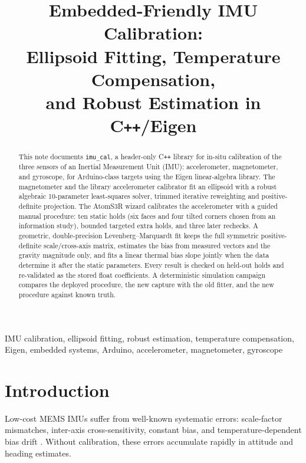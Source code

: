 \documentclass[conference]{IEEEtran}
\title{Embedded-Friendly IMU Calibration:\\
Ellipsoid Fitting, Temperature Compensation,\\
and Robust Estimation in C\texttt{++}/Eigen}
\author{%
    \IEEEauthorblockN{Mikhail S.\ Grushinskiy}
    \IEEEauthorblockA{Independent Researcher\\
    Bareboat Necessities Project\\
    \texttt{mgrouch@users.github.com}}
}
\begin{document}
    \maketitle

    \begin{abstract}
        This note documents \texttt{imu\_cal}, a header-only C\texttt{++}
        library for in-situ calibration of the three sensors of an Inertial
        Measurement Unit (IMU): accelerometer, magnetometer, and gyroscope,
        for Arduino-class targets using the Eigen linear-algebra library.
        The magnetometer and the library accelerometer calibrator fit an
        ellipsoid with a robust algebraic 10-parameter least-squares solver,
        trimmed iterative reweighting and positive-definite projection.
        The AtomS3R wizard calibrates the accelerometer with a guided manual
        procedure: ten static holds (six faces and four tilted corners chosen
        from an information study), bounded targeted extra holds, and three
        later rechecks. A geometric, double-precision Levenberg--Marquardt fit
        keeps the full symmetric positive-definite scale/cross-axis matrix,
        estimates the bias from measured vectors and the gravity magnitude
        only, and fits a linear thermal bias slope jointly when the data
        determine it after the static parameters. Every result is checked on
        held-out holds and re-validated as the stored float coefficients.
        A deterministic simulation campaign compares the deployed procedure,
        the new capture with the old fitter, and the new procedure against
        known truth.
    \end{abstract}

    \begin{IEEEkeywords}
        IMU calibration, ellipsoid fitting, robust estimation,
        temperature compensation, Eigen, embedded systems, Arduino,
        accelerometer, magnetometer, gyroscope
    \end{IEEEkeywords}

    \section{Introduction}

    Low-cost MEMS IMUs suffer from well-known systematic errors:
    scale-factor mismatches, inter-axis cross-sensitivity, constant bias,
    and temperature-dependent bias drift \cite{Frosio2009}.
    Without calibration, these errors accumulate rapidly in attitude
    and heading estimates.
\end{document}
